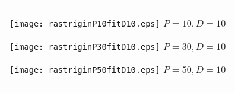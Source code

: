\documentclass[a4paper,11pt,oneside,openany]{jsbook}
\begin{document}
\begin{figure}[htbp]
  \begin{center}
    \begin{tabular}{c}


      \begin{minipage}{0.33\hsize}
        \begin{center}
          \texttt{[image: rastriginP10fitD10.eps]}
          \hspace{1.2cm}$P=10, D=10
$        \end{center}
      \end{minipage}

      \begin{minipage}{0.33\hsize}
        \begin{center}
          \texttt{[image: rastriginP30fitD10.eps]}
          \hspace{1.2cm}$P=30, D=10
$        \end{center}
      \end{minipage}

      \begin{minipage}{0.33\hsize}
        \begin{center}
          \texttt{[image: rastriginP50fitD10.eps]}
          \hspace{1.2cm}$P=50, D=10
$        \end{center}
      \end{minipage}
    \end{tabular}
  \end{center}
\end{figure}
\end{document}
